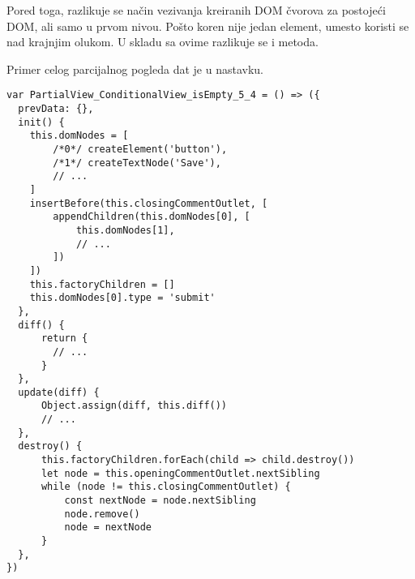 Pored toga, razlikuje se način vezivanja kreiranih DOM čvorova za postojeći DOM, ali samo u prvom nivou.
Pošto koren nije jedan element, umesto  koristi se  nad krajnjim olukom.
U skladu sa ovime razlikuje se i  metoda.

Primer celog parcijalnog pogleda dat je u nastavku.

\begin{lstlisting}
var PartialView_ConditionalView_isEmpty_5_4 = () => ({
  prevData: {},
  init() {
    this.domNodes = [
        /*0*/ createElement('button'),
        /*1*/ createTextNode('Save'),
        // ...
    ]
    insertBefore(this.closingCommentOutlet, [
        appendChildren(this.domNodes[0], [
            this.domNodes[1],
            // ...
        ])
    ])
    this.factoryChildren = []
    this.domNodes[0].type = 'submit'
  },
  diff() {
      return {
        // ...
      }
  },
  update(diff) {
      Object.assign(diff, this.diff())
      // ...
  },
  destroy() {
      this.factoryChildren.forEach(child => child.destroy())
      let node = this.openingCommentOutlet.nextSibling
      while (node != this.closingCommentOutlet) {
          const nextNode = node.nextSibling
          node.remove()
          node = nextNode
      }
  },
})
\end{lstlisting}
